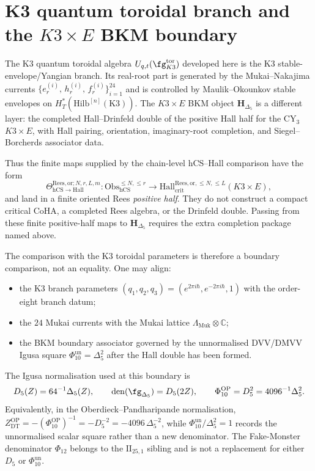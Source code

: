 \section{K3 quantum toroidal branch and the \texorpdfstring{$K3 \times E$}{K3 x E} BKM boundary}
\label{sec:k3qt-bkm-shadow}

\begin{remark}
\label{rem:k3qt-bkm-shadow}
The K3 quantum toroidal algebra
$U_{q,t}(\fg_{K3}^{\mathrm{tor}})$ developed here is the K3
stable-envelope/Yangian branch. Its real-root part is generated by the
Mukai--Nakajima currents
$\{e^{(i)}_r,\,h^{(i)}_r,\,f^{(i)}_r\}_{i=1}^{24}$ and is controlled by
Maulik--Okounkov stable envelopes on
$H^*_T(\mathrm{Hilb}^{[n]}(\mathrm K3))$. The $K3 \times E$ BKM object
$\mathbf H_{\Delta_5}$ is a different layer: the completed
Hall--Drinfeld double of the positive Hall half for the CY$_3$
$K3 \times E$, with Hall pairing, orientation, imaginary-root
completion, and Siegel--Borcherds associator data.

Thus the finite maps supplied by the chain-level hCS--Hall comparison
have the form
\[
 \Theta_{\mathrm{hCS}\to\mathrm{Hall}}^{
 \mathrm{Rees,or};N,r,L,m}
 \colon
 \mathrm{Obs}^{\leq N,\leq r}_{\mathrm{hCS}}
 \longrightarrow
 \mathrm{Hall}_{\mathrm{crit}}^{\mathrm{Rees,or},\leq N,\leq L}
 (K3 \times E),
\]
and land in a finite oriented Rees \emph{positive half}. They do not
construct a compact critical CoHA, a completed Rees algebra, or the
Drinfeld double. Passing from these finite positive-half maps to
$\mathbf H_{\Delta_5}$ requires the extra completion package named
above.

The comparison with the K3 toroidal parameters is therefore a boundary
comparison, not an equality. One may align:
\begin{itemize}
\item the K3 branch parameters
$(q_1,q_2,q_3)=(e^{2\pi i\hbar},e^{-2\pi i\hbar},1)$ with the
order-eight branch datum;
\item the $24$ Mukai currents with the Mukai lattice
$\Lambda_{\mathrm{Muk}}\otimes\mathbb C$;
\item the BKM boundary associator governed by the unnormalised
DVV/DMVV Igusa square $\Phi_{10}^{\mathrm{un}}=\Delta_5^2$ after the
Hall double has been formed.
\end{itemize}
The Igusa normalisation used at this boundary is
\[
 D_5(Z)=64^{-1}\Delta_5(Z),\qquad
 \operatorname{den}(\fg_{\Delta_5})=D_5(2Z),
 \qquad
 \Phi_{10}^{\mathrm{OP}}=D_5^2=4096^{-1}\Delta_5^2.
\]
Equivalently, in the Oberdieck--Pandharipande normalisation,
$Z_{\mathrm{DT}}^{\mathrm{OP}}=-(\Phi_{10}^{\mathrm{OP}})^{-1}
=-D_5^{-2}=-4096\,\Delta_5^{-2}$, while
$\Phi_{10}^{\mathrm{un}}/\Delta_5^2=1$ records the unnormalised scalar
square rather than a new denominator.
The Fake-Monster denominator $\Phi_{12}$ belongs to the
$\mathrm{II}_{25,1}$ sibling and is not a replacement for either
$D_5$ or \(\Phi_{10}^{\mathrm{un}}\).


\end{remark}
